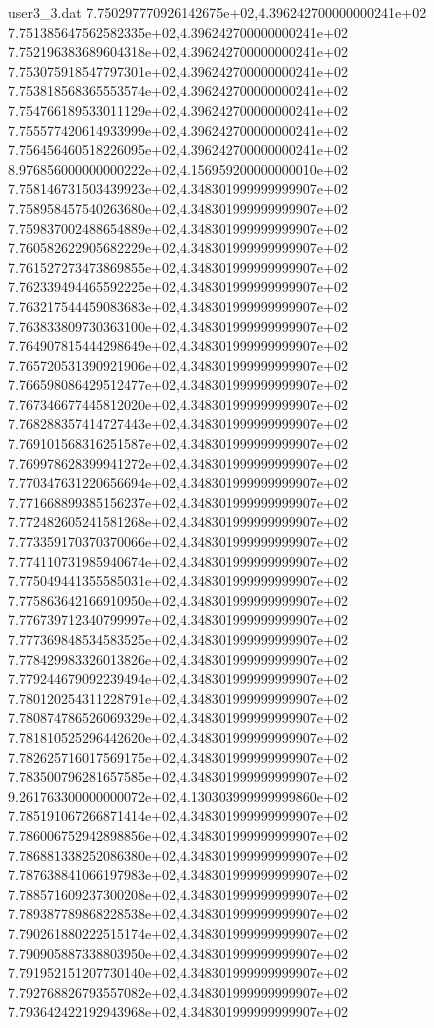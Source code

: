 \begin{filecontents}{user3_3.dat}
7.750297770926142675e+02,4.396242700000000241e+02
7.751385647562582335e+02,4.396242700000000241e+02
7.752196383689604318e+02,4.396242700000000241e+02
7.753075918547797301e+02,4.396242700000000241e+02
7.753818568365553574e+02,4.396242700000000241e+02
7.754766189533011129e+02,4.396242700000000241e+02
7.755577420614933999e+02,4.396242700000000241e+02
7.756456460518226095e+02,4.396242700000000241e+02
8.976856000000000222e+02,4.156959200000000010e+02
7.758146731503439923e+02,4.348301999999999907e+02
7.758958457540263680e+02,4.348301999999999907e+02
7.759837002488654889e+02,4.348301999999999907e+02
7.760582622905682229e+02,4.348301999999999907e+02
7.761527273473869855e+02,4.348301999999999907e+02
7.762339494465592225e+02,4.348301999999999907e+02
7.763217544459083683e+02,4.348301999999999907e+02
7.763833809730363100e+02,4.348301999999999907e+02
7.764907815444298649e+02,4.348301999999999907e+02
7.765720531390921906e+02,4.348301999999999907e+02
7.766598086429512477e+02,4.348301999999999907e+02
7.767346677445812020e+02,4.348301999999999907e+02
7.768288357414727443e+02,4.348301999999999907e+02
7.769101568316251587e+02,4.348301999999999907e+02
7.769978628399941272e+02,4.348301999999999907e+02
7.770347631220656694e+02,4.348301999999999907e+02
7.771668899385156237e+02,4.348301999999999907e+02
7.772482605241581268e+02,4.348301999999999907e+02
7.773359170370370066e+02,4.348301999999999907e+02
7.774110731985940674e+02,4.348301999999999907e+02
7.775049441355585031e+02,4.348301999999999907e+02
7.775863642166910950e+02,4.348301999999999907e+02
7.776739712340799997e+02,4.348301999999999907e+02
7.777369848534583525e+02,4.348301999999999907e+02
7.778429983326013826e+02,4.348301999999999907e+02
7.779244679092239494e+02,4.348301999999999907e+02
7.780120254311228791e+02,4.348301999999999907e+02
7.780874786526069329e+02,4.348301999999999907e+02
7.781810525296442620e+02,4.348301999999999907e+02
7.782625716017569175e+02,4.348301999999999907e+02
7.783500796281657585e+02,4.348301999999999907e+02
9.261763300000000072e+02,4.130303999999999860e+02
7.785191067266871414e+02,4.348301999999999907e+02
7.786006752942898856e+02,4.348301999999999907e+02
7.786881338252086380e+02,4.348301999999999907e+02
7.787638841066197983e+02,4.348301999999999907e+02
7.788571609237300208e+02,4.348301999999999907e+02
7.789387789868228538e+02,4.348301999999999907e+02
7.790261880222515174e+02,4.348301999999999907e+02
7.790905887338803950e+02,4.348301999999999907e+02
7.791952151207730140e+02,4.348301999999999907e+02
7.792768826793557082e+02,4.348301999999999907e+02
7.793642422192943968e+02,4.348301999999999907e+02

\end{filecontents}
